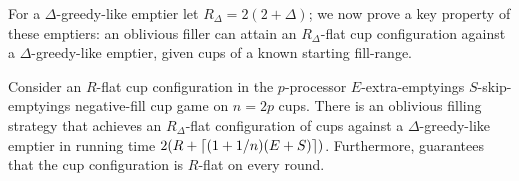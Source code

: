 For a $\Delta$-greedy-like emptier let $R_\Delta = 2(2+\Delta)$;
we now prove a key property of these emptiers: an oblivious
filler can attain an $R_\Delta$-flat cup configuration against a
$\Delta$-greedy-like emptier, given cups of a known starting
fill-range.

\begin{lemma}
  \label{lem:greedylikeisflat}
  Consider an $R$-flat cup configuration in the $p$-processor
  $E$-extra-emptyings $S$-skip-emptyings negative-fill cup game on $n =
  2p$ cups. There is an oblivious filling strategy
   that achieves an $R_\Delta$-flat
  configuration of cups against a $\Delta$-greedy-like emptier in
  running time $2(R + \left\lceil (1+1/n)(E + S) \right\rceil)$. Furthermore,
  \flatalg guarantees that the cup configuration is $R$-flat on every round.
\end{lemma}
